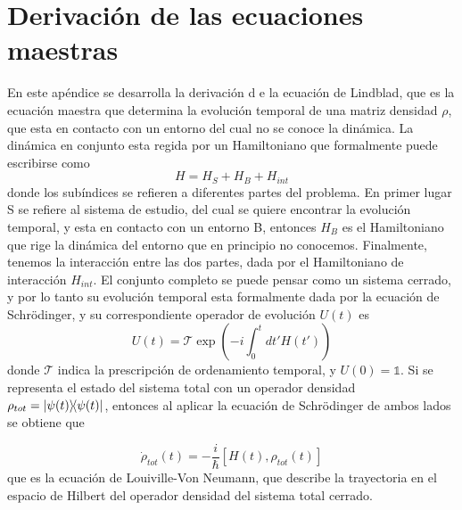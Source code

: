 \chapter{Derivación de las ecuaciones maestras}
\label{ap_ecsmaestras}

\pagestyle{fancy}
\fancyhf{}
\fancyhead[LE]{\nouppercase{\rightmark\hfill}}
\fancyhead[RO]{\nouppercase{\leftmark\hfill}}
\fancyfoot[LE,RO]{\hfill\thepage\hfill}

En este apéndice se desarrolla la derivación d
e la ecuación de Lindblad, que es la ecuación maestra que determina la evolución temporal de una matriz densidad $\rho$, que esta en contacto con un entorno del cual no se conoce la dinámica. La dinámica en conjunto esta regida por un Hamiltoniano que formalmente puede escribirse como
\begin{equation}
    H=H_S+H_B+H_{int}
\end{equation}
donde los subíndices se refieren a diferentes partes del problema. En primer lugar S se refiere al sistema de estudio, del cual se quiere encontrar la evolución temporal, y esta en contacto con un entorno B, entonces $H_B$ es el Hamiltoniano que rige la dinámica del entorno que en principio no conocemos. Finalmente, tenemos la interacción entre las dos partes, dada por el Hamiltoniano de interacción $H_{int}$.
El conjunto completo se puede pensar como un sistema cerrado, y por lo tanto su evolución temporal esta formalmente dada por la ecuación de Schr\"odinger, y su correspondiente operador de evolución $U(t)$ es
\begin{equation}
    U(t)=\mathcal{T}\exp\left( -i\int_{0}^{t}dt'H(t') \right)
\end{equation}
donde $\mathcal{T}$ indica la prescripción de ordenamiento temporal, y $U(0)=\mathbb{1}$. Si se representa el estado del sistema total con un operador densidad $\rho_{tot}=\ketbra{\psi(t)}{\psi(t)}$, entonces al aplicar la ecuación de Schr\"odinger de ambos lados se obtiene que 

\begin{equation}
    \dot\rho_{tot}(t)=-\frac{i}{\hbar}[H(t),\rho_{tot}(t)]
\end{equation}
que es la ecuación de Louiville-Von Neumann, que describe la trayectoria en el espacio de Hilbert del operador densidad del sistema total cerrado.


